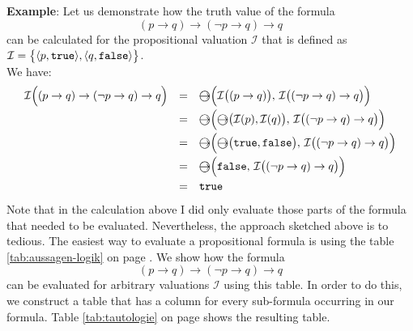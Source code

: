 \noindent
\textbf{Example}: Let us demonstrate how the truth value of the formula
$$  (p \rightarrow q) \rightarrow (\neg p \rightarrow q) \rightarrow q $$
can be calculated for the propositional valuation $\mathcal{I}$ that is defined as
\\[0.2cm]
\hspace*{1.3cm}
$\mathcal{I} = \bigl\{ \pair(p, \mathtt{true}), \pair(q,\mathtt{false}) \bigr\}$.
\\[0.2cm]
We have: 
\[
  \begin{array}{lcl}
   \mathcal{I}\Bigl( (p \rightarrow q) \rightarrow (\neg p \rightarrow q) \rightarrow q  \Bigr) 
   & = &  \circright\Bigl( \mathcal{I}\bigl( (p \rightarrow q) \bigr),\, \mathcal{I}\bigl((\neg p \rightarrow q) \rightarrow q\bigr) \Bigr) \\[0.2cm]
   & = & \circright\Bigl( \circright\bigl( \mathcal{I}(p), \mathcal{I}(q) \bigr),\, \mathcal{I}\bigl((\neg p \rightarrow q) \rightarrow q\bigr) \Bigr) \\[0.2cm]
   & = & \circright\Bigl( \circright\bigl( \mathtt{true}, \mathtt{false} \bigr),\, \mathcal{I}\bigl((\neg p \rightarrow q) \rightarrow q\bigr) \Bigr) \\[0.2cm]
   & = & \circright\Bigl( \mathtt{false}, \, \mathcal{I}\bigl((\neg p \rightarrow q) \rightarrow q\bigr) \Bigr) \\[0.2cm]
   & = & \mathtt{true} \\
 \end{array}
\]
Note that in the calculation above I did only evaluate those parts of the formula that needed to be
evaluated.  Nevertheless, the approach sketched above is to tedious.  The easiest way to evaluate
a propositional formula is using the table \ref{tab:aussagen-logik} on page
\pageref{tab:aussagen-logik}.  We show how the formula
$$  (p \rightarrow q) \rightarrow (\neg p \rightarrow q) \rightarrow q $$
can be evaluated for arbitrary valuations $\mathcal{I}$ using this table.  In order to do this,
we construct a table that has a column for every sub-formula occurring in our formula.
Table \ref{tab:tautologie} on page \pageref{tab:tautologie} shows the resulting table.
